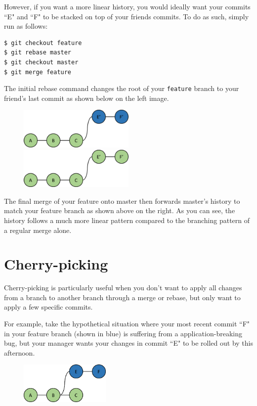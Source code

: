 \documentclass[12pt]{report}
\renewcommand\section[1]{{\chapter{#1}}}
\begin{document}
However, if you want a more linear history, you would ideally want your commits ``E" and ``F" to be stacked on top of your friends commits.  To do as such, simply run as follows:
\begin{verbatim}
$ git checkout feature
$ git rebase master
$ git checkout master
$ git merge feature
\end{verbatim}

The initial rebase command changes the root of your \texttt{feature} branch to your friend's last commit as shown below on the left image.

\begin{figure}[h]
\center
\includegraphics[height=2cm]{rebase}
\includegraphics[height=2cm]{rebase_merge}
\end{figure}

The final merge of your feature onto master then forwards master's history to match your feature branch as shown above on the right.  As you can see, the history follows a much more linear pattern compared to the branching pattern of a regular merge alone.

\section{Cherry-picking}

Cherry-picking is particularly useful when you don't want to apply all changes from a branch to another branch through a merge or rebase, but only want to apply a few specific commits.

For example, take the hypothetical situation where your most recent commit ``F" in your feature branch (shown in blue) is suffering from a application-breaking bug, but your manager wants your changes in commit ``E" to be rolled out by this afternoon.

\begin{figure}[h]
\center
\includegraphics[height=2cm]{feature}
\end{figure}
\end{document}
